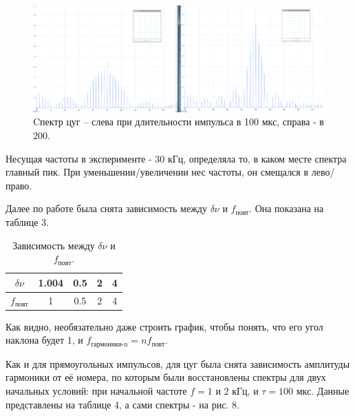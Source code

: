 \documentclass[a4paper, 14pt]{extarticle}%
\newcommand\ECaption[1]{%
     \captionsetup{font=footnotesize}%
     \caption{#1}}
\begin{document}
\begin{figure}[h!]
\begin{center}
\includegraphics[width=1\textwidth]{cy}
\end{center}
\ECaption{Cпектр цуг -- слева при длительности импульса в 100 мкс, справа - в 200.}
\end{figure}

Несущая частоты в эксперименте - 30 кГц, определяла то, в каком месте спектра главный пик. При уменьшении/увеличении нес частоты, он смещался в лево/право.

Далее по работе была снята зависимость между $\delta\nu$ и $f_{\text{повт}}$. Она показана на таблице 3.

\begin{table}[h!]
\begin{center}
\begin{tabular}{|c|c|c|c|c|}
\hline
\rowcolor[HTML]{9698ED} 
$\delta\nu$       & 1.004 & 0.5 & 2 & 4 \\ \hline
$f_{\text{повт}}$ & 1     & 0.5 & 2 & 4 \\ \hline
\end{tabular}
\ECaption{Зависимость между $\delta\nu$ и $f_{\text{повт}}$.}
\end{center}
\end{table}

Как видно, необязательно даже строить график, чтобы понять, что его угол наклона будет 1, и $f_{\text{гармоники-n}} = nf_{\text{повт}}$.

Как и для прямоугольных импульсов, для цуг была снята зависимость амплитуды гармоники от её номера, по которым были восстановлены спектры для двух начальных условий: при начальной частоте $f = 1$ и 2 кГц, и $\tau = 100 $  мкс. Данные представлены на таблице 4, а сами спектры - на рис. 8.
\end{document}
